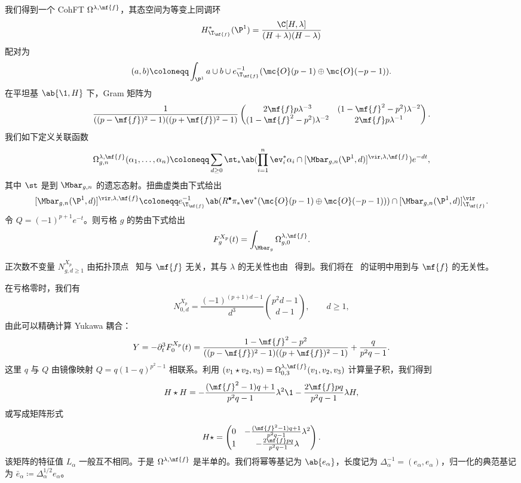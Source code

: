 我们得到一个 CohFT \(\Omega^{\lambda,\mf{f}}\)，其态空间为等变上同调环
\[ H^*_{\T_{\mf{f}}}(\P^1) = \frac{\C[H,\lambda]}{(H+\lambda)(H-\lambda)} \]
配对为
\[ (a,b) \coloneqq \int_{\P^1} a \cup b \cup e^{-1}_{\T_{\mf{f}}}(\mc{O}(p-1)\oplus\mc{O}(-p-1)). \]
在平坦基 \(\ab\{\1,H\}\) 下，Gram 矩阵为
\[ \frac{1}{((p-\mf{f})^2-1)((p+\mf{f})^2-1)}\begin{pmatrix} 2\mf{f}p\lambda^{-3} & (1-\mf{f}^2-p^2)\lambda^{-2} \\ (1-\mf{f}^2-p^2)\lambda^{-2} & 2\mf{f}p\lambda^{-1} \end{pmatrix}. \]
我们如下定义关联函数
\[ \Omega^{\lambda,\mf{f}}_{g,n}(\alpha_1,\ldots,\alpha_n) \coloneqq \sum_{d\geq0}\st_*\ab(\prod_{i=1}^n \ev_i^*\alpha_i \cap [\Mbar_{g,n}(\P^1,d)]^{\vir,\lambda,\mf{f}})e^{-dt}, \]
其中 \(\st\) 是到 \(\Mbar_{g,n}\) 的遗忘态射。扭曲虚类由下式给出
\[ [\Mbar_{g,n}(\P^1,d)]^{\vir,\lambda,\mf{f}} \coloneqq e^{-1}_{\T_{\mf{f}}}\ab(R^{\bullet}\pi_*\ev^*(\mc{O}(p-1)\oplus\mc{O}(-p-1))) \cap [\Mbar_{g,n}(\P^1,d)]^{\vir}_{\T_{\mf{f}}}. \]
令 \(Q = (-1)^{p+1}e^{-t}\)。则亏格 \(g\) 的势由下式给出
\[ F^{X_p}_g(t) = \int_{\Mbar_g} \Omega^{\lambda,\mf{f}}_{g,0}. \]

\begin{rmk}
    正次数不变量 \(N^{X_p}_{g,d\geq1}\) 由拓扑顶点~\cite{LLLZ2009} 知与 \(\mf{f}\) 无关，其与 \(\lambda\) 的无关性也由~ 得到。我们将在~ 的证明中用到与 \(\mf{f}\) 的无关性。
\end{rmk}

在亏格零时，我们有
\[ N^{X_p}_{0,d} = \frac{(-1)^{(p+1)d-1}}{d^3}\binom{p^2d-1}{d-1}, \qquad d \geq 1, \]
由此可以精确计算 Yukawa 耦合：
\[ Y = -\partial_t^3 F_0^{X_p}(t) = \frac{1-\mf{f}^2-p^2}{((p-\mf{f})^2-1)((p+\mf{f})^2-1)} + \frac{q}{p^2q-1}. \]
这里 \(q\) 与 \(Q\) 由镜像映射 \(Q = q(1-q)^{p^2-1}\) 相联系。利用 \((v_1 \star v_2, v_3) = \Omega^{\lambda,\mf{f}}_{0,3}(v_1,v_2,v_3)\) 计算量子积，我们得到
\[ H \star H = -\frac{(\mf{f}^2-1)q+1}{p^2q-1}\lambda^2 \1 - \frac{2\mf{f}pq}{p^2q-1}\lambda H, \]
或写成矩阵形式
\[ H \star = \begin{pmatrix} 0 & -\frac{(\mf{f}^2-1)q+1}{p^2q-1}\lambda^2 \\ 1 & -\frac{2\mf{f}pq}{p^2q-1}\lambda \end{pmatrix}. \]
该矩阵的特征值 \(L_{\alpha}\) 一般互不相同。于是 \(\Omega^{\lambda,\mf{f}}\) 是半单的。我们将幂等基记为 \(\ab\{e_{\alpha}\}\)，长度记为 \(\Delta_{\alpha}^{-1} = (e_{\alpha},e_{\alpha})\)，归一化的典范基记为 \(\bar{e}_{\alpha} \coloneqq \Delta_{\alpha}^{1/2}e_{\alpha}\)。

